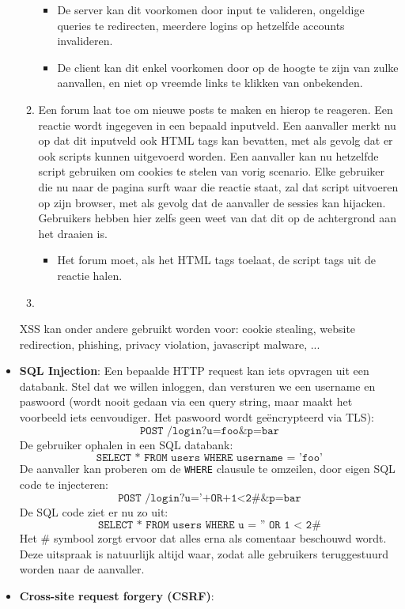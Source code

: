 \documentclass{report}
\begin{document}
\begin{itemize}
\begin{enumerate}
			\begin{itemize}
				\item[\info] De server kan dit voorkomen door input te valideren, ongeldige queries te redirecten, meerdere logins op hetzelfde accounts invalideren.
				\item[\info] De client kan dit enkel voorkomen door op de hoogte te zijn van zulke aanvallen, en niet op vreemde links te klikken van onbekenden.
			\end{itemize}
			\item Een forum laat toe om nieuwe posts te maken en hierop te reageren. Een reactie wordt ingegeven in een bepaald inputveld. Een aanvaller merkt nu op dat dit inputveld ook HTML tags kan bevatten, met als gevolg dat er ook scripts kunnen uitgevoerd worden. Een aanvaller kan nu hetzelfde script gebruiken om cookies te stelen van vorig scenario. Elke gebruiker die nu naar de pagina surft waar die reactie staat, zal dat script uitvoeren op zijn browser, met als gevolg dat de aanvaller de sessies kan hijacken. Gebruikers hebben hier zelfs geen weet van dat dit op de achtergrond aan het draaien is.
			\begin{itemize}
				\item[\info] Het forum moet, als het HTML tags toelaat, de script tags uit de reactie halen.
			\end{itemize}
			\item 
		\end{enumerate}

		XSS kan onder andere gebruikt worden voor: cookie stealing, website redirection, phishing, privacy violation, javascript malware, ...
		\item[\info] \textbf{SQL Injection}: Een bepaalde HTTP request kan iets opvragen uit een databank. Stel dat we willen inloggen, dan versturen we een username en paswoord (wordt nooit gedaan via een query string, maar maakt het voorbeeld iets eenvoudiger. Het paswoord wordt geëncrypteerd via TLS):
		$$\texttt{POST /login?u=foo\&p=bar}$$
		De gebruiker ophalen in een SQL databank:
		$$\texttt{SELECT * FROM users WHERE username = 'foo'}$$
		De aanvaller kan proberen om de \texttt{WHERE} clausule te omzeilen, door eigen SQL code te injecteren:
		$$\texttt{POST /login?u='+OR+1<2\#\&p=bar}$$
		De SQL code ziet er nu zo uit:
		$$\texttt{SELECT * FROM users WHERE u = '' OR 1 < 2\#}$$
		Het \# symbool zorgt ervoor dat alles erna als comentaar beschouwd wordt. Deze uitspraak is natuurlijk altijd waar, zodat alle gebruikers teruggestuurd worden naar de aanvaller.
		
		\item[\info] \textbf{Cross-site request forgery (CSRF)}:
	\end{itemize}
\end{document}
